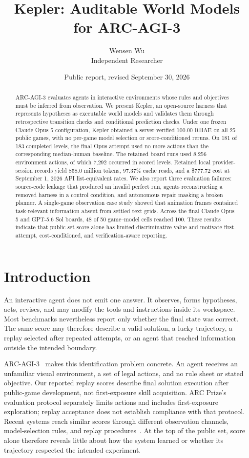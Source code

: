 \documentclass[11pt]{article}
\title{Kepler: Auditable World Models for ARC-AGI-3}
\author{Wensen Wu\\
Independent Researcher}
\date{Public report, revised September 30, 2026}
\begin{document}
\maketitle


\begin{abstract}
ARC-AGI-3 evaluates agents in interactive environments whose rules and objectives must be inferred from observation. We present Kepler, an open-source harness that represents hypotheses as executable world models and validates them through retrospective transition checks and conditional prediction checks. Under one frozen Claude Opus 5 configuration, Kepler obtained a server-verified 100.00 RHAE on all 25 public games, with no per-game model selection or score-conditioned reruns. On 181 of 183 completed levels, the final Opus attempt used no more actions than the corresponding median-human baseline. The retained board runs used 8,256 environment actions, of which 7,292 occurred in scored levels. Retained local provider-session records yield 858.0 million tokens, 97.37\% cache reads, and a \$777.72 cost at September 1, 2026 API list-equivalent rates. We also report three evaluation failures: source-code leakage that produced an invalid perfect run, agents reconstructing a removed harness in a control condition, and autonomous repair masking a broken planner. A single-game observation case study showed that animation frames contained task-relevant information absent from settled text grids. Across the final Claude Opus 5 and GPT-5.6 Sol boards, 48 of 50 game--model cells reached 100. These results indicate that public-set score alone has limited discriminative value and motivate first-attempt, cost-conditioned, and verification-aware reporting.
\end{abstract}

\section{Introduction}\label{sec:intro}

An interactive agent does not emit one answer. It observes, forms hypotheses,
acts, revises, and may modify the tools and instructions inside its workspace.
Most benchmarks nevertheless report only whether the final state was correct.
The same score may therefore describe a valid solution, a lucky trajectory, a
replay selected after repeated attempts, or an agent that reached information
outside the intended boundary.

ARC-AGI-3~\citep{arcagi3} makes this identification problem concrete. An agent
receives an unfamiliar visual environment, a set of legal actions, and no rule
sheet or stated objective. Our reported replay scores describe final solution
execution after public-game development, not first-exposure skill acquisition.
ARC Prize's evaluation protocol separately limits actions and includes
first-exposure exploration; replay acceptance does not establish compliance
with that protocol. Recent systems reach similar
scores through different observation channels, model-selection rules, and
replay procedures~\citep{tycho,retrodict,vista,avo,primeagent}. At the top of
the public set, score alone therefore reveals little about how the system
learned or whether its trajectory respected the intended experiment.
\end{document}
